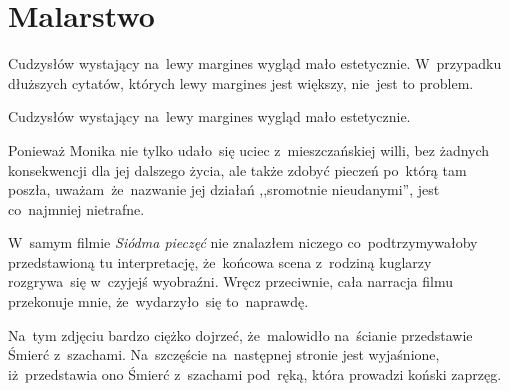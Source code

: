 \documentclass[a4paper,11pt]{article}
\begin{document}
\newpage
\section{Malarstwo}

\vspace{\spaceTwo}







\start {} Cudzysłów wystający na~lewy margines wygląd mało
estetycznie. W~przypadku dłuższych cytatów, których lewy margines jest
większy, nie~jest to problem.

\vspace{\spaceFour}



\start {} Cudzysłów wystający na~lewy margines wygląd mało
estetycznie.

\vspace{\spaceFour}



\start {} Ponieważ Monika nie tylko udało~się uciec
z~mieszczańskiej willi, bez żadnych konsekwencji dla jej dalszego
życia, ale także zdobyć pieczeń po~którą tam poszła,
uważam~że~nazwanie jej działań ,,sromotnie nieudanymi'', jest
co~najmniej nietrafne.

\vspace{\spaceFour}



\start {} W~samym filmie \emph{Siódma pieczęć} nie znalazłem
niczego co~podtrzymywałoby przedstawioną tu interpretację,
że~końcowa scena z~rodziną kuglarzy rozgrywa~się w~czyjejś
wyobraźni. Wręcz przeciwnie, cała narracja filmu przekonuje mnie,
że~wydarzyło~się to~naprawdę.

\vspace{\spaceFour}



\start {} Na~tym zdjęciu bardzo ciężko dojrzeć, że~malowidło
na~ścianie przedstawie Śmierć z~szachami. Na~szczęście na~następnej
stronie jest wyjaśnione, iż~przedstawia ono Śmierć z~szachami
pod~ręką, która prowadzi koński zaprzęg.

\vspace{\spaceFour}
\end{document}
